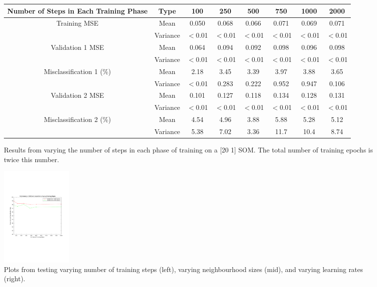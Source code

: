 \documentclass[10pt, oneside]{article}
\begin{document}
\begin{figure}[h]
\begin{center}
\fontsize{9}{11}\selectfont
\begin{tabular}{|*{8}{c|}}
\hline 
Number of Steps in Each Training Phase & Type & 100 & 250 & 500 & 750 & 1000 & 2000 \\ \hline
\multirow{2}{*}{Training MSE} & Mean & 0.050 & 0.068 & 0.066 & 0.071 & 0.069 & 0.071 \\ \cline{2-8}
\ & Variance & $<$0.01 & $<$0.01 & $<$0.01 & $<$0.01 & $<$0.01 & $<$0.01 \\ \hline
\multirow{2}{*}{Validation 1 MSE} & Mean & 0.064 & 0.094 & 0.092 & 0.098 & 0.096 & 0.098  \\ \cline{2-8}
\ & Variance & $<$0.01 & $<$0.01 & $<$0.01 & $<$0.01 & $<$0.01 & $<$0.01 \\ \hline
\multirow{2}{*}{Misclassification 1 (\%)} & Mean & 2.18 & 3.45 & 3.39 & 3.97 & 3.88 & 3.65 \\ \cline{2-8}
\ & Variance & $<$0.01 & 0.283 & 0.222 & 0.952 & 0.947 & 0.106 \\ \hline
\multirow{2}{*}{Validation 2 MSE} & Mean & 0.101 & 0.127 & 0.118 & 0.134 & 0.128 & 0.131 \\ \cline{2-8}
\ & Variance & $<$0.01 & $<$0.01 & $<$0.01 & $<$0.01 & $<$0.01 & $<$0.01 \\ \hline
\multirow{2}{*}{Misclassification 2 (\%)} & Mean & 4.54 & 4.96 & 3.88 & 5.88 & 5.28 & 5.12 \\ \cline{2-8}
\ & Variance & 5.38 & 7.02 & 3.36 & 11.7 & 10.4 & 8.74 \\ \hline
\end{tabular}
\end{center}
\caption{\label{fig:steps-testing} Results from varying the number of steps in each phase of training on a [20 1] SOM. The total number of training epochs is twice this number.}
\end{figure}

\begin{figure}[h]
\begin{center}
\includegraphics[height=5cm]{steps-plot.pdf}
\end{center}
\caption{\label{fig:testing-plots} Plots from testing varying number of training steps (left), varying neighbourhood sizes (mid), and varying learning rates (right).}
\end{figure}
\end{document}
